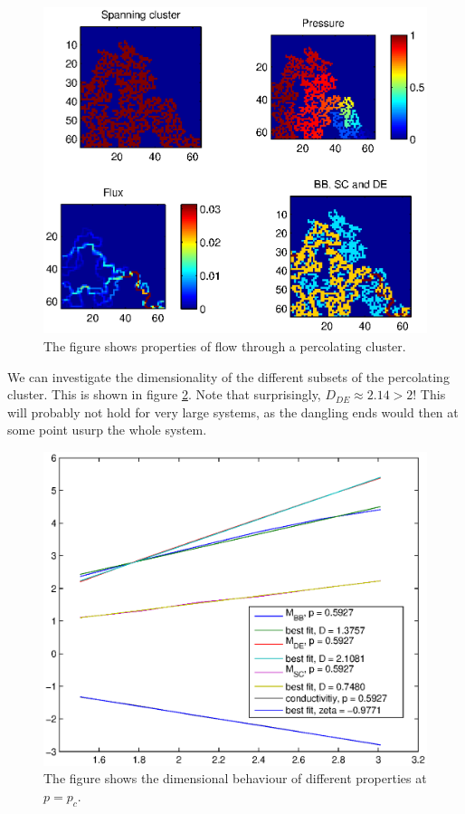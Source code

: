 \documentclass[12pt]{article}
\begin{document}
\begin{figure}[ht]
\centering

	\includegraphics[width=13cm]{testexflow.eps}


\caption[Optional caption for list of figures]{The figure shows properties of flow through a percolating cluster.}
\label{fig:tef}
\end{figure}

 We can investigate the dimensionality of the different subsets of the percolating cluster. This is shown in figure \ref{fig:massd}. Note that surprisingly, $D_{DE} \approx 2.14 > 2$! This will probably not hold for very large systems, as the dangling ends would then at some point usurp the whole system. 
 
  \begin{figure}[ht]
\centering

	\includegraphics[width=13cm]{massdims.eps}


\caption[Optional caption for list of figures]{The figure shows the dimensional behaviour of different properties at $p=p_c$.}
\label{fig:massd}
\end{figure}
 
\end{document}
